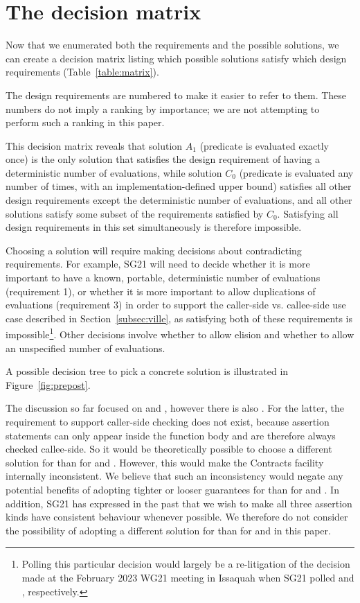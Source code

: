 
\section{The decision matrix}
Now that we enumerated both the requirements and the possible solutions, we can create a decision matrix listing which possible solutions satisfy which design requirements (Table~\ref{table:matrix}).

The design requirements are numbered to make it easier to refer to them. These numbers do not imply a ranking by importance; we are not attempting to perform such a ranking in this paper.

This decision matrix reveals that solution $A_1$ (predicate is evaluated exactly once) is the only solution that satisfies the design requirement of having a deterministic number of evaluations, while solution $C_0$ (predicate is evaluated any number of times, with an implementation-defined upper bound) satisfies all other design requirements except the deterministic number of evaluations, and all other solutions satisfy some subset of the requirements satisfied by $C_0$. Satisfying all design requirements in this set simultaneously is therefore impossible.

Choosing a solution will require making decisions about contradicting requirements. For example, SG21 will need to decide  whether it is more important to have a known, portable, deterministic number of evaluations (requirement 1), or whether it is more important to allow duplications of evaluations (requirement 3) in order to support the caller-side vs. callee-side use case described in Section~\ref{subsec:ville}, as satisfying both of these requirements is impossible\footnote{Polling this particular decision would largely be a re-litigation of the decision made at the February 2023 WG21 meeting in Issaquah when SG21 polled \cite{P2756R0} and \cite{P2751R1}, respectively.}. Other decisions involve whether to allow elision and whether to allow an unspecified number of evaluations.

A possible decision tree to pick a concrete solution is illustrated in Figure~\ref{fig:prepost}.


The discussion so far focused on  and , however there is also . For the latter, the requirement to support caller-side checking does not exist, because assertion statements can only appear inside the function body and are therefore always checked callee-side. So it would be theoretically possible to choose a different solution for   than for  and . However, this would make the Contracts facility internally inconsistent. We believe that such an inconsistency would negate any potential benefits of adopting tighter or looser guarantees for  than for  and . In addition, SG21 has expressed in the past that we wish to make all three assertion kinds have consistent behaviour whenever possible. We therefore do not consider the possibility of adopting a different solution for  than for  and  in this paper.

